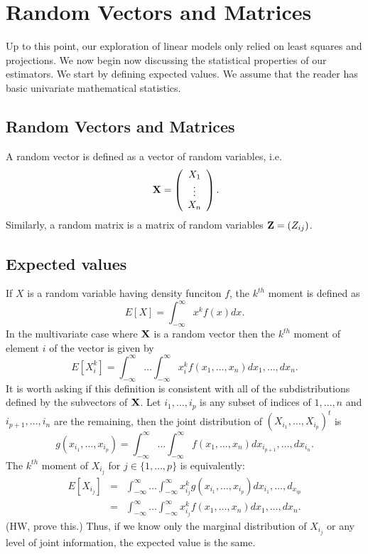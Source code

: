\section{Random Vectors and Matrices}
Up to this point, our exploration of linear models only relied on least squares
and projections. We now begin now discussing the statistical properties of our
estimators. We start by defining expected values. We assume that the reader
has basic univariate mathematical statistics.


\subsection{Random Vectors and Matrices}

A random vector is defined as a vector of random variables, i.e. $$\ \mathbf{X} =
\left(\begin{array}{c}X_1\\ \vdots\\X_n\end{array}\right).$$  Similarly, a random matrix is a matrix of random variables $\mathbf{Z}=(Z_{ij})$.



\subsection{Expected values}


If $X$ is a random variable having density funciton $f$, 
the $k^{th}$ moment is defined as 
$$
E[X] = \int_{-\infty}^{\infty} x^k f(x) dx.
$$
In the multivariate case where $\mathbf{X}$ is a random vector
then the $k^{th}$ moment of element $i$ of the vector is 
given by 
$$
E[X_i^k] = \int_{-\infty}^{\infty} \ldots \int_{-\infty}^{\infty} x_i^k f(x_1, \ldots, x_n) dx_1, \ldots, dx_n.
$$
It is worth asking if this definition is consistent with all
of the subdistributions defined by the subvectors of $\mathbf{X}$. 
Let $i_1, \ldots, i_p$ is any subset of indices of $1,\ldots, n$ and
$i_{p+1}, \ldots, i_{n}$ are the remaining, then the 
joint distribution of $(X_{i_1},\ldots, X_{i_p})^t$ is 
$$
g(x_{i_1}, \ldots, x_{i_p}) = \int_{-\infty}^{\infty} \ldots \int_{-\infty}^{\infty}
f(x_1, \ldots, x_n) dx_{i_{p+1}}, \ldots, dx_{i_{n}}.
$$
The $k^{th}$ moment of $X_{i_j}$ for $j \in \{1,\ldots, p\}$ is equivalently:
\begin{eqnarray*}
E[X_{i_j}] & = & \int_{-\infty}^{\infty} \ldots \int_{-\infty}^{\infty}
x_{i_j}^k g(x_{i_1}, \ldots, x_{i_p}) dx_{i_1}, \ldots, d_{x_{ip}} \\
& = & \int_{-\infty}^{\infty} \ldots \int_{-\infty}^{\infty}
x_{i_j}^k f(x_1, \ldots, x_n) dx_1, \ldots, dx_n.
\end{eqnarray*}
(HW, prove this.) Thus, if we know only the marginal distribution 
of $X_{i_j}$ or any level of joint information, the expected value is the same.

